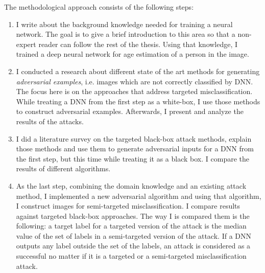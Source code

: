 The methodological approach consists of the following steps:
\begin{enumerate}
    \item I write about the background knowledge needed for training a neural network. The goal is to give a brief introduction to this area so that a non-expert reader can follow the rest of the thesis. Using that knowledge, I trained a deep neural network for age estimation of a person in the image.
    
    \item I conducted a research about different state of the art methods for generating \textit{adversarial examples}, i.e. images which are not correctly classified by DNN. The focus here is on the approaches that address targeted misclassification. While treating a DNN from the first step as a white-box, I use those methods to construct adversarial examples. Afterwards, I present and analyze the results of the attacks.
    
    \item I did a literature survey on the targeted black-box attack methods, explain those methods and use them to generate adversarial inputs for a DNN  from the first step, but this time while treating it as a black box. I compare the results of different algorithms.
    
    \item As the last step, combining the domain knowledge and an existing attack method, I implemented a new adversarial algorithm and using that algorithm, I construct images for semi-targeted misclassification. I compare results against targeted black-box approaches. The way I is compared them is the following: a target label for a targeted version of the attack is the median value of the set of labels in a semi-targeted version of the attack. If a DNN outputs any label outside the set of the labels, an attack is  considered as a successful no matter if it is a targeted or a semi-targeted misclassification attack.
\end{enumerate}
